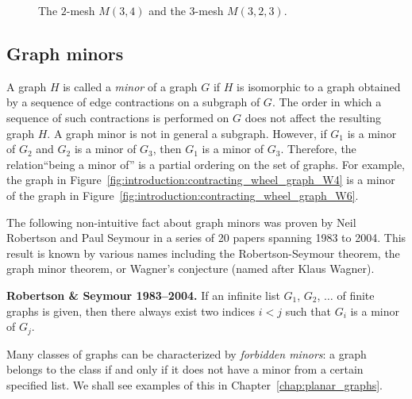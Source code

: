 \begin{figure}[!htbp]
\centering

\caption{The $2$-mesh $M(3, 4)$ and the $3$-mesh $M(3, 2, 3)$.}
\label{fig:introduction:mesh_grid_lattice}
\end{figure}



\subsection{Graph minors}

A graph $H$ is called a \emph{minor} of a graph $G$
if $H$ is isomorphic to a graph obtained by a sequence of edge
contractions on a subgraph of $G$.  The order in which a sequence of
such contractions is performed on $G$ does not affect the resulting
graph $H$. A graph minor is not in general a subgraph. However, if
$G_1$ is a minor of $G_2$ and $G_2$ is a minor of $G_3$, then $G_1$ is
a minor of $G_3$. Therefore, the relation``being a minor of'' is a
partial ordering on the set of graphs. For example, the graph in
Figure~\ref{fig:introduction:contracting_wheel_graph_W4} is a minor of
the graph in Figure~\ref{fig:introduction:contracting_wheel_graph_W6}.

The following non-intuitive fact about graph minors was proven by
Neil Robertson and Paul Seymour in a series of 20 papers spanning 1983
to 2004. This result is known by various names including the
Robertson-Seymour theorem, the graph minor theorem, or Wagner's
conjecture (named after Klaus Wagner).

\begin{theorem}
\label{thm:introduction:graph_minor}
\textbf{Robertson \& Seymour 1983--2004.}
If an infinite list $G_1$, $G_2$, $\dots$ of finite graphs is given,
then there always exist two indices $i < j$ such that $G_i$ is a minor
of $G_j$.
\end{theorem}

Many classes of graphs can be characterized by
\emph{forbidden minors}: a graph belongs to the class if and only if
it does not have a minor from a certain specified list. We shall see
examples of this in Chapter~\ref{chap:planar_graphs}.



